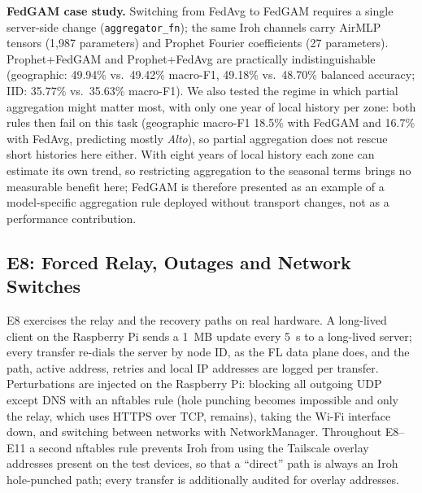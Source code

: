 \textbf{FedGAM case study.} Switching from FedAvg to FedGAM requires a single server-side change (\texttt{aggregator\_fn}); the same Iroh channels carry AirMLP tensors (1{,}987 parameters) and Prophet Fourier coefficients (27 parameters). Prophet+FedGAM and Prophet+FedAvg are practically indistinguishable (geographic: 49.94\% vs.\ 49.42\% macro-F1, 49.18\% vs.\ 48.70\% balanced accuracy; IID: 35.77\% vs.\ 35.63\% macro-F1). We also tested the regime in which partial aggregation might matter most, with only one year of local history per zone: both rules then fail on this task (geographic macro-F1 18.5\% with FedGAM and 16.7\% with FedAvg, predicting mostly \textit{Alto}), so partial aggregation does not rescue short histories here either. With eight years of local history each zone can estimate its own trend, so restricting aggregation to the seasonal terms brings no measurable benefit here; FedGAM is therefore presented as an example of a model-specific aggregation rule deployed without transport changes, not as a performance contribution.

\subsection{E8: Forced Relay, Outages and Network Switches}
\label{sec:e8}

E8 exercises the relay and the recovery paths on real hardware. A long-lived client on the Raspberry Pi sends a 1~MB update every 5~s to a long-lived server; every transfer re-dials the server by node ID, as the FL data plane does, and the path, active address, retries and local IP addresses are logged per transfer. Perturbations are injected on the Raspberry Pi: blocking all outgoing UDP except DNS with an nftables rule (hole punching becomes impossible and only the relay, which uses HTTPS over TCP, remains), taking the Wi-Fi interface down, and switching between networks with NetworkManager. Throughout E8--E11 a second nftables rule prevents Iroh from using the Tailscale overlay addresses present on the test devices, so that a ``direct'' path is always an Iroh hole-punched path; every transfer is additionally audited for overlay addresses.

